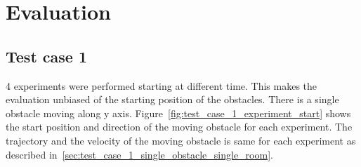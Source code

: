 
\chapter{Evaluation}
\newpage{}
\section{Test case 1}%
\label{sec:test_case_1}

4 experiments were performed starting at different time. This makes the evaluation unbiased of
the starting position of the obstacles. There is a single obstacle moving along y axis.  
Figure~\ref{fig:test_case_1_experiment_start} shows the start position and direction of the moving
obstacle for each experiment. The trajectory and the velocity of the moving obstacle is same for each
experiment as described in~\ref{sec:test_case_1_single_obstacle_single_room}.

